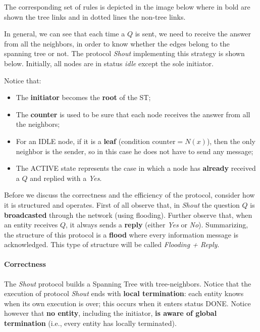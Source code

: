 The corresponding set of rules is depicted in the image below where in bold are shown the tree links and in dotted lines the non-tree links. 


In general, we can see that each time a $Q$ is sent, we need to receive the answer from all the neighbors, in order to know whether the edges belong to the spanning tree or not. The protocol \textit{Shout} implementing this strategy is shown below. Initially, all nodes are in status \textit{idle} except the sole initiator.


Notice that:
\begin{itemize}
    \item The \textbf{initiator} becomes the \textbf{root} of the ST;
    \item The \textbf{counter} is used to be sure that each node receives the answer from all the neighbors;
    \item For an IDLE node, if it is a \textbf{leaf} (condition $\text{counter} = N(x)$), then the only neighbor is the sender, so in this case he does not have to send any message;
    \item The ACTIVE state represents the case in which a node has \textbf{already} received a $Q$ and replied with a \textit{Yes}.
\end{itemize}



Before we discuss the correctness and the efficiency of the protocol, consider how it is structured and operates. First of all observe that, in \textit{Shout} the question $Q$ is \textbf{broadcasted} through the network (using flooding). Further observe that, when an entity receives $Q$, it always sends a \textbf{reply} (either \textit{Yes} or \textit{No}). Summarizing, the structure of this protocol is a \textbf{flood} where every information message is acknowledged. This type of structure will be called \textit{Flooding + Reply}.

\paragraph{Correctness} The \textit{Shout} protocol builds a Spanning Tree with tree-neighbors. Notice that the execution of protocol \textit{Shout} ends with \textbf{local termination}: each entity knows when its own execution is over; this occurs when it enters status DONE. Notice however that \textbf{no entity}, including the initiator, \textbf{is aware of global termination} (i.e., every entity has locally terminated).

